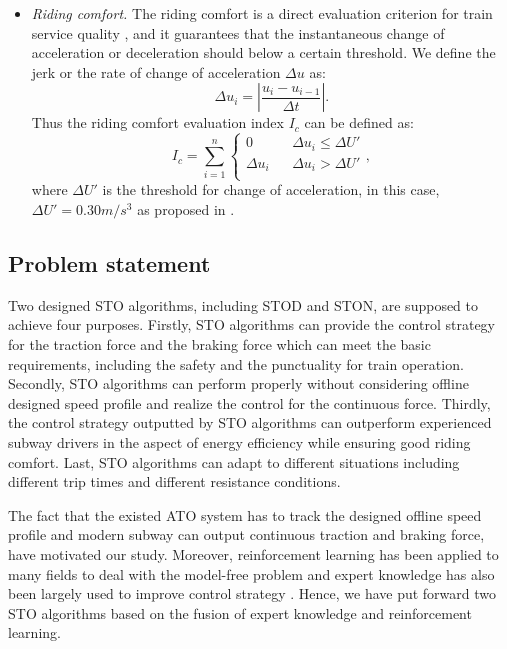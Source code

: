 \documentclass[journal]{IEEEtran}
\begin{document}
\begin{itemize}
\begin{equation}
	E=\sum_{i=1}^n( M |u_i| v(t_i) \Delta t).
	\end{equation}
	Based on the equation of consumed energy, we define the energy efficiency evaluation index \(I_e\) as 
	\begin{equation}
	I_e= \frac{E}{M}. 
	\end{equation}
	\item \emph{Riding comfort.} The riding comfort is a direct evaluation criterion for train service quality \cite{powell2015passenger}, and it guarantees that the instantaneous change of acceleration or deceleration should below a certain threshold. We define the jerk or the rate of change of acceleration $\Delta u$ as:
	\begin{equation}
	\Delta u_{i} = |\frac{u_{i}-u_{i-1}}{\Delta t}|.
	\end{equation}
	Thus the riding comfort evaluation index \(I_c\) can be defined as:
	\begin{equation}
	I_c=\sum_{i=1}^n\left\{
	\begin{array}{rcl}
	0 & & \Delta u_{i} \leq \Delta U'\\
	\Delta u_{i} & & \Delta u_{i} > \Delta U'\\
	\end{array} 
	\right.,
	\end{equation}
	where $\Delta U'$ is the threshold for change of acceleration, in this case, $\Delta U' = 0.30 m/s^3$ as proposed in \cite{hoberock1977survey}.
\end{itemize}

\subsection{Problem statement}
Two designed STO algorithms, including STOD and STON, are supposed to achieve four purposes. Firstly, STO algorithms can provide the control strategy for the traction force and the braking force which can meet the basic requirements, including the safety and the punctuality for train operation. Secondly, STO algorithms can perform properly without considering offline designed speed profile and realize the control for the continuous force. Thirdly, the control strategy outputted by STO algorithms can outperform experienced subway drivers in the aspect of energy efficiency while ensuring good riding comfort. Last, STO algorithms can adapt to different situations including different trip times and different resistance conditions.    
\par The fact that the existed ATO system has to track the designed offline speed profile and modern subway can output continuous traction and braking force, have motivated our study. Moreover, reinforcement learning has been applied to many fields to deal with the model-free problem \cite{ruelens2015learning} and expert knowledge has also been largely used to improve control strategy \cite{cheng2017intelligent}. Hence, we have put forward two STO algorithms based on the fusion of expert knowledge and reinforcement learning.
\end{document}
